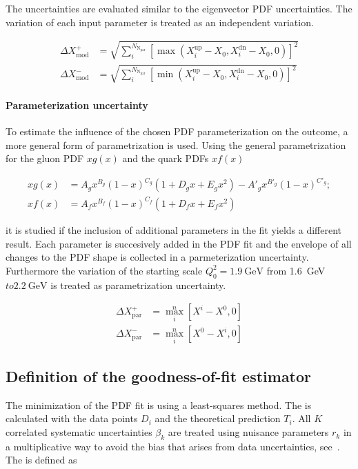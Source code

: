 The uncertainties are evaluated similar to the eigenvector PDF uncertainties.
The variation of each input parameter is treated as an independent variation.

\begin{align*}
  \Delta X^+_{\mathrm{mod}} &= \sqrt{\sum_i^{N_{\mathrm{N_{\mathrm{par}}}}} \left[ \max(X_i^{\mathrm{up}}
    -X_0, X_i^{\mathrm{dn}} - X_0, 0)\right]^2}\\
    \Delta X^-_{\mathrm{mod}} &= \sqrt{\sum_i^{N_{\mathrm{N_{\mathrm{par}}}}} \left[ \min(X_i^{\mathrm{up}} - X_0, X_i^{\mathrm{dn}} - X_0,0)\right]^2}
\end{align*}

\paragraph{Parameterization uncertainty}

To estimate the influence of the chosen PDF parameterization on the outcome, a
more general form of parametrization is used. Using the general parametrization
for the gluon PDF $xg(x)$ and the quark PDFs $xf(x)$

\begin{align}
   xg(x) &= A_g x^{B_g} (1-x)^{C_g} (1  + D_g x + E_g x^2) - A'_g x^{B'_g} (1-x)^{C'_g};\\
   xf(x) &= A_{f}  x^{B_{f}} (1-x)^{C_{f}} (1 + D_{f}x + E_{f}x^2)
\end{align}

it is studied if the inclusion of additional parameters in the fit yields a
different result. Each parameter is succesively added in the PDF fit and the
envelope of all changes to the PDF shape is collected in a parmeterization
uncertainty. Furthermore the variation of the starting scale $Q_0^2 =
\SI{1.9}{\GeV}$ from \SI{1.6}{\GeV}$ to \SI{2.2}{\GeV}$ is treated as
parametrization uncertainty.

\begin{align*}
  \Delta X^+_{\mathrm{par}} &= \max_{i}^{n} \left[ X^i - X^0, 0 \right]\\
  \Delta X^-_{\mathrm{par}} &= \max_{i}^{n} \left[ X^0 - X^i, 0 \right]
\end{align*}


\subsection{Definition of the goodness-of-fit estimator}
\label{sec:chi2_definition}

The minimization of the PDF fit is using a least-squares method. The \chisq is
calculated with the data points $D_i$ and the theoretical prediction $T_i$. All
$K$ correlated systematic uncertainties $\beta_k$ are treated using nuisance
parameters $r_k$ in a multiplicative way to avoid the bias that arises from data
uncertainties, see~\cite{Lyons:1989gh}. The \chisq is defined as

